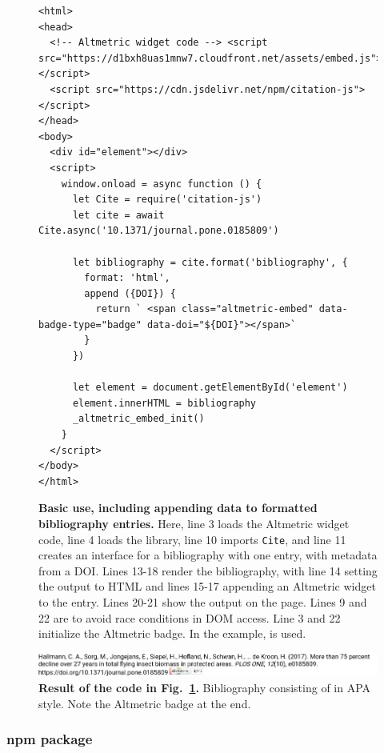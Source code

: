 \documentclass[fleqn,10pt,lineno]{wlpeerj} %
\begin{document}
\begin{figure}[bt!]
\centering
\begin{small}
\begin{verbatim}
<html>
<head>
  <!-- Altmetric widget code --> <script src="https://d1bxh8uas1mnw7.cloudfront.net/assets/embed.js"></script>
  <script src="https://cdn.jsdelivr.net/npm/citation-js"></script>
</head>
<body>
  <div id="element"></div>
  <script>
    window.onload = async function () {
      let Cite = require('citation-js')
      let cite = await Cite.async('10.1371/journal.pone.0185809')
      
      let bibliography = cite.format('bibliography', {
        format: 'html',
        append ({DOI}) {
          return ` <span class="altmetric-embed" data-badge-type="badge" data-doi="${DOI}"></span>`
        }
      })
    
      let element = document.getElementById('element')
      element.innerHTML = bibliography
      _altmetric_embed_init()
    }
  </script>
</body>
</html>
\end{verbatim}
\end{small}
\caption{\textbf{Basic use, including appending data to formatted bibliography entries.}
Here, line 3 loads the Altmetric widget code, line 4 loads the library, line 10 imports \texttt{Cite}, and line 11 creates an interface for a bibliography with one entry, with metadata from a DOI. Lines 13-18 render the bibliography, with line 14 setting the output to HTML and lines 15-17 appending an Altmetric widget to the entry. Lines 20-21 show the output on the page. Lines 9 and 22 are to avoid race conditions in DOM access. Line 3 and 22 initialize the Altmetric badge. In the example, \citep{hallmann_more_2017} is used.
}
\label{code:use}
\end{figure}

\begin{figure}[bt!]
\centering
\includegraphics[width=\linewidth]{figures/use_altmetric.png}
\caption{\textbf{Result of the code in Fig.~\ref{code:use}.} Bibliography consisting of \cite{hallmann_more_2017} in APA style. Note the Altmetric badge at the end.}
\label{fig:use}
\end{figure}

\subsubsection*{npm package}
\end{document}
